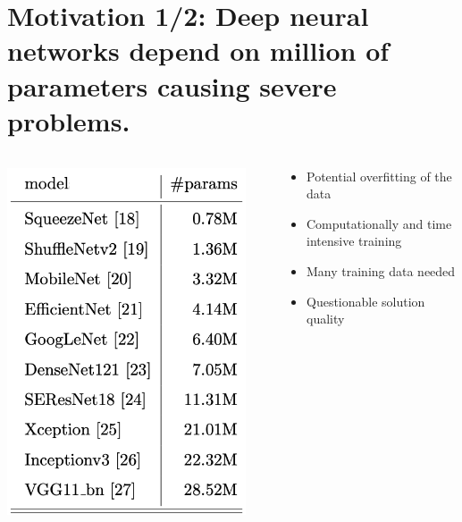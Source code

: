 \documentclass[t]{beamer}
\begin{document}
\section{Motivation 1/2: Deep neural networks depend on million of parameters causing severe problems.}
\begin{frame}
\begin{columns}[c]

\begin{column}{0.4\textwidth}
\begin{center}
\includegraphics[width=0.92\textwidth]{parameters.png}
\end{center}
\end{column}

\begin{column}{0.5\textwidth}
\begin{itemize}
\item Potential overfitting of the data \vspace{1cm}
\item Computationally and time intensive training \vspace{1cm} 
\item Many training data needed \vspace{1cm}
\item Questionable solution quality  
\end{itemize}
\end{column}

\end{columns}
\end{frame}
\end{document}
